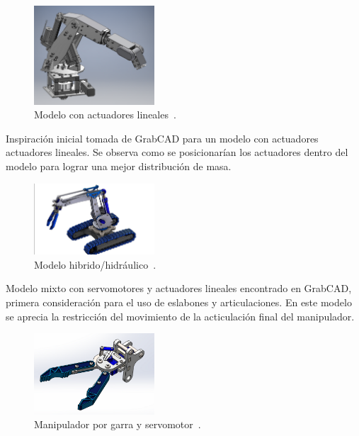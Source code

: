 \begin{multicols}{2}

\begin{figure}[H]
  \centering
  \includegraphics[width=0.4\textwidth]{anexos/inspiraciones/1actuadores.png}
  \caption{Modelo con actuadores lineales~\cite{grabcad_robot_arm_6dof}.}\label{fig:insp.actuadores}
\end{figure}

Inspiración inicial tomada de GrabCAD para un modelo con actuadores actuadores lineales. Se observa como se posicionarían los actuadores dentro del modelo para lograr una mejor distribución de masa.

\begin{figure}[H]
  \centering
  \includegraphics[width=0.4\textwidth]{anexos/inspiraciones/2oruga.png}
  \caption{Modelo hibrido/hidráulico~\cite{grabcad_robotic_arm_216}.}\label{fig:insp.oruga}
\end{figure}

Modelo mixto con servomotores y actuadores lineales encontrado en GrabCAD, primera consideración para el uso de eslabones y articulaciones. En este modelo se aprecia la restricción del movimiento de la acticulación final del manipulador.

\begin{figure}[H]
  \centering
  \includegraphics[width=0.4\textwidth]{anexos/inspiraciones/3orugaGarra.png}
  \caption{Manipulador por garra y servomotor~\cite{grabcad_robotic_gripper_17}.}\label{fig:insp.orugaGarra}
\end{figure}


\end{multicols}
